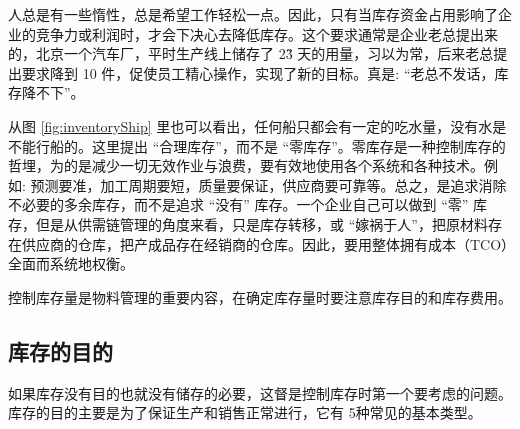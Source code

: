     人总是有一些惰性，总是希望工作轻松一点。因此，只有当库存资金占用影响了企业的竞争力或利润时，才会下决心去降低库存。这个要求通常是企业老总提出来的，北京一个汽车厂，平时生产线上储存了 2\~3 天的用量，习以为常，后来老总提出要求降到 10 件，促使员工精心操作，实现了新的目标。真是: “老总不发话，库存降不下”。

    从图 \ref{fig:inventoryShip} 里也可以看出，任何船只都会有一定的吃水量，没有水是不能行船的。这里提出 “合理库存”，而不是 “零库存”。零库存是一种控制库存的哲埋，为的是减少一切无效作业与浪费，要有效地使用各个系统和各种技术。例如: 预测要准，加工周期要短，质量要保证，供应商要可靠等。总之，是追求消除不必要的多余库存，而不是追求 “没有” 库存。一个企业自己可以做到 “零” 库存，但是从供需链管理的角度来看，只是库存转移，或 “嫁祸于人”，把原材料存在供应商的仓库，把产成品存在经销商的仓库。因此，要用整体拥有成本（TCO）全面而系统地权衡。

    控制库存量是物料管理的重要内容，在确定库存量时要注意库存目的和库存费用。

\subsection {库存的目的}

    如果库存没有目的也就没有储存的必要，这督是控制库存时第一个要考虑的问题。库存的目的主要是为了保证生产和销售正常进行，它有 5种常见的基本类型。


